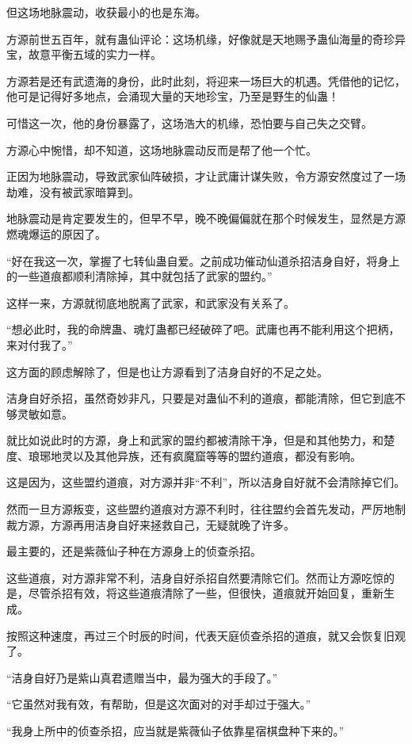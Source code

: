 \begin{this_body}
但这场地脉震动，收获最小的也是东海。

方源前世五百年，就有蛊仙评论：这场机缘，好像就是天地赐予蛊仙海量的奇珍异宝，故意平衡五域的实力一样。

方源若是还有武遗海的身份，此时此刻，将迎来一场巨大的机遇。凭借他的记忆，他可是记得好多地点，会涌现大量的天地珍宝，乃至是野生的仙蛊！

可惜这一次，他的身份暴露了，这场浩大的机缘，恐怕要与自己失之交臂。

方源心中惋惜，却不知道，这场地脉震动反而是帮了他一个忙。

正因为地脉震动，导致武家仙阵破损，才让武庸计谋失败，令方源安然度过了一场劫难，没有被武家暗算到。

地脉震动是肯定要发生的，但早不早，晚不晚偏偏就在那个时候发生，显然是方源燃魂爆运的原因了。

“好在我这一次，掌握了七转仙蛊自爱。之前成功催动仙道杀招洁身自好，将身上的一些道痕都顺利清除掉，其中就包括了武家的盟约。”

这样一来，方源就彻底地脱离了武家，和武家没有关系了。

“想必此时，我的命牌蛊、魂灯蛊都已经破碎了吧。武庸也再不能利用这个把柄，来对付我了。”

这方面的顾虑解除了，但是也让方源看到了洁身自好的不足之处。

洁身自好杀招，虽然奇妙非凡，只要是对蛊仙不利的道痕，都能清除，但它到底不够灵敏如意。

就比如说此时的方源，身上和武家的盟约都被清除干净，但是和其他势力，和楚度、琅琊地灵以及其他异族，还有疯魔窟等等的盟约道痕，都没有影响。

这是因为，这些盟约道痕，对方源并非“不利”，所以洁身自好就不会清除掉它们。

然而一旦方源叛变，这些盟约道痕对方源不利时，往往盟约会首先发动，严厉地制裁方源，方源再用洁身自好来拯救自己，无疑就晚了许多。

最主要的，还是紫薇仙子种在方源身上的侦查杀招。

这些道痕，对方源非常不利，洁身自好杀招自然要清除它们。然而让方源吃惊的是，尽管杀招有效，将这些道痕清除了一些，但很快，道痕就开始回复，重新生成。

按照这种速度，再过三个时辰的时间，代表天庭侦查杀招的道痕，就又会恢复旧观了。

“洁身自好乃是紫山真君遗赠当中，最为强大的手段了。”

“它虽然对我有效，有帮助，但是这次面对的对手却过于强大。”

“我身上所中的侦查杀招，应当就是紫薇仙子依靠星宿棋盘种下来的。”


\end{this_body}
